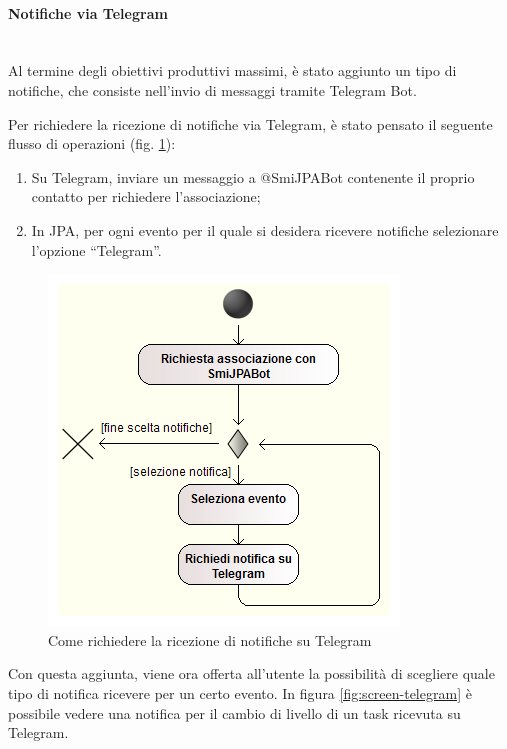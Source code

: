 \paragraph{Notifiche via Telegram} \mbox{} \\

Al termine degli obiettivi produttivi massimi, è stato aggiunto un tipo di
notifiche, che consiste nell'invio di messaggi tramite Telegram Bot.

Per richiedere la ricezione di notifiche via Telegram, è stato pensato il
seguente flusso di operazioni (fig. \ref{fig:telegram-request}):

\begin{enumerate}
\item Su Telegram, inviare un messaggio a @SmiJPABot contenente il proprio
  contatto per richiedere l'associazione;
\item In JPA, per ogni evento per il quale si desidera ricevere notifiche
  selezionare l'opzione ``Telegram''.
\end{enumerate}

\begin{figure}%
\centering
\includegraphics[width=.8\columnwidth]{immagini/telegram-notif-wf}
\caption{Come richiedere la ricezione di notifiche su Telegram}
\label{fig:telegram-request}%
\end{figure}

Con questa aggiunta, viene ora offerta all'utente la possibilità di scegliere
quale tipo di notifica ricevere per un certo evento. In figura
\ref{fig:screen-telegram} è possibile vedere una notifica per il cambio di
livello di un task ricevuta su Telegram.

